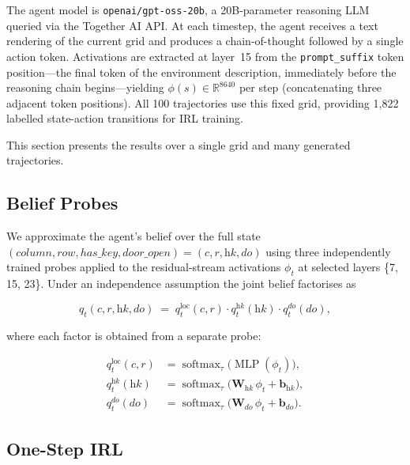 \documentclass[final]{sparreport}
\begin{document}
The agent model is \texttt{openai/gpt-oss-20b}, a 20B-parameter 
reasoning LLM queried via the Together AI API. At each timestep, 
the agent receives a text rendering of the current grid and produces 
a chain-of-thought followed by a single action token. Activations are 
extracted at layer~15 from the \texttt{prompt\_suffix} token 
position---the final token of the environment description, immediately 
before the reasoning chain begins---yielding $\phi(s) \in 
\mathbb{R}^{8640}$ per step (concatenating three adjacent token 
positions). All 100 trajectories use this fixed grid, providing 
1,822 labelled state-action transitions for IRL training.


This section presents the results over a single grid and many generated trajectories. 


\subsection{Belief Probes}

We approximate the agent's belief over the full state $(column, row, has\_key, door\_open) = (c, r, \textit{hk}, \textit{do})$
using three independently trained probes applied to the residual-stream activations
$\phi_t$ at selected layers \{7, 15, 23\}. Under an independence assumption the joint belief factorises as

\begin{equation}
    q_t(c, r, \textit{hk}, \textit{do})
    \;=\;
    q_t^{\text{loc}}(c, r)
    \cdot
    q_t^{\textit{hk}}(\textit{hk})
    \cdot
    q_t^{\textit{do}}(\textit{do}),
\end{equation}

where each factor is obtained from a separate probe:

\begin{align*}
    q_t^{\text{loc}}(c, r)              &= \operatorname{softmax}_\tau\!\bigl(\operatorname{MLP}(\phi_t)\bigr), \\
    q_t^{\textit{hk}}(\textit{hk})      &= \operatorname{softmax}_\tau\!\bigl(\mathbf{W}_{\textit{hk}}\,\phi_t + \mathbf{b}_{\textit{hk}}\bigr), \\
    q_t^{\textit{do}}(\textit{do})      &= \operatorname{softmax}_\tau\!\bigl(\mathbf{W}_{\textit{do}}\,\phi_t + \mathbf{b}_{\textit{do}}\bigr).
\end{align*}



\subsection{One-Step IRL}
\end{document}
